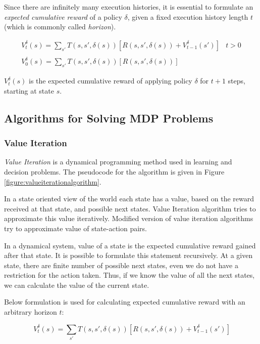 Since there are infinitely many execution histories, it is essential to formulate an \emph{expected cumulative reward} of a policy $\delta$, given a fixed execution history length $t$ (which is commonly called \emph{horizon}).

\begin{displaymath}
\begin{array}{rl}V_t^\delta (s) = \sum_{s'} T(s ,s', \delta(s)) [ R(s, s', \delta(s)) + V_{t-1}^\delta (s')]  & t>0 \\
& \\
V_0^\delta (s) = \sum_{s'} T(s, s', \delta(s)) [ R(s, s', \delta(s)) ]\end{array}
\end{displaymath}

$V_t^\delta (s)$ is the expected cumulative reward of applying policy $\delta$ for $t+1$ steps, starting at state $s$.

\subsection{Algorithms for Solving MDP Problems}

\subsubsection{Value Iteration}

\emph{Value Iteration} is a dynamical programming method used in learning and decision problems. The pseudocode for the algorithm is given in Figure \ref{figure:valueiterationalgorithm}.

In a state oriented view of the world each state has a value, based on the reward received at that state, and possible next states. Value Iteration algorithm tries to approximate this value iteratively. Modified version of value iteration algorithms try to approximate value of state-action pairs.

In a dynamical system, value of a state is the expected cumulative reward gained after that state. It is possible to formulate this statement recursively. At a given state, there are finite number of possible next states, even we do not have a restriction for the action taken. Thus, if we know the value of all the next states, we can calculate the value of the current state.

Below formulation is used for calculating expected cumulative reward with an arbitrary horizon $t$:

\begin{displaymath}
\ V_t^\delta (s) = \sum_{s'} T(s ,s', \delta(s)) [ R(s, s', \delta(s)) + V_{t-1}^\delta (s')]
\end{displaymath}

